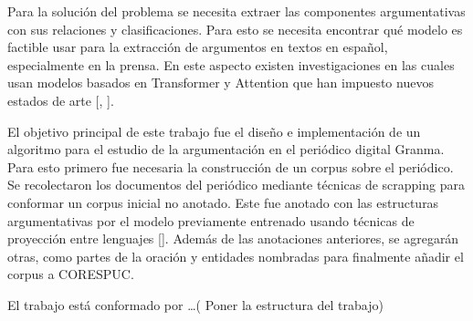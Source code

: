 
Para la solución del problema se necesita extraer las componentes argumentativas con sus relaciones
y clasificaciones. Para esto se necesita encontrar qué modelo es factible usar para la extracción de
argumentos en textos en español, especialmente en la prensa. En este aspecto existen investigaciones
en las cuales usan modelos basados en Transformer y Attention que han impuesto nuevos estados de arte
[\cite{mayer2020transformer}, \cite{galassi2021deep}].


El objetivo principal de este trabajo fue el diseño e implementación de un algoritmo para 
el estudio de la argumentación en el periódico digital Granma. Para esto primero
fue necesaria la construcción de un corpus sobre el periódico. Se recolectaron los documentos
del periódico mediante técnicas de scrapping para conformar un corpus inicial no anotado. Este
fue anotado con las estructuras argumentativas por el modelo previamente entrenado usando técnicas 
de proyección entre lenguajes [\cite{eger2018cross}]. Además de las anotaciones anteriores, se agregarán 
otras, como partes de la oración y entidades nombradas para finalmente añadir el corpus a CORESPUC.


El trabajo está conformado por \dots ( Poner la estructura del trabajo)




